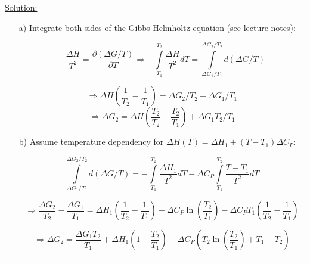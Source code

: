\noindent
\underline{Solution:}\\

\begin{itemize}
\item[a)] Integrate both sides of the Gibbs-Helmholtz equation (see lecture notes):

$$-\frac{\Delta H}{T^2} = \frac{\partial (\Delta G / T)}{\partial T} \Rightarrow -\int\limits_{T_1}^{T_2}\frac{\Delta H}{T^2}dT = \int\limits_{\Delta G_1 / T_1}^{\Delta G_2 / T_2}d\left(\Delta G / T\right)$$

$$\Rightarrow \Delta H\left(\frac{1}{T_2} - \frac{1}{T_1}\right) = \Delta G_2 / T_2 - \Delta G_1 / T_1$$
$$\Rightarrow \Delta G_2 = \Delta H\left(\frac{T_2}{T_2} - \frac{T_2}{T_1}\right) + \Delta G_1T_2 / T_1$$

\item[b)] Assume temperature dependency for $\Delta H(T) = \Delta H_1 + \left(T - T_1\right)\Delta C_P$:

$$\int\limits_{\Delta G_1 / T_1}^{\Delta G_2 / T_2}d\left(\Delta G / T\right) = -\int\limits_{T_1}^{T_2}\frac{\Delta H_1}{T^2}dT - \Delta C_P\int\limits_{T_1}^{T_2}\frac{T - T_1}{T^2}dT$$

$$\Rightarrow \frac{\Delta G_2}{T_2} - \frac{\Delta G_1}{T_1} = \Delta H_1\left(\frac{1}{T_2} - \frac{1}{T_1}\right) - \Delta C_P\ln\left(\frac{T_2}{T_1}\right) - \Delta C_PT_1\left(\frac{1}{T_2} - \frac{1}{T_1}\right)$$

$$\Rightarrow \Delta G_2 = \frac{\Delta G_1 T_2}{T_1} + \Delta H_1\left(1 - \frac{T_2}{T_1}\right) - \Delta C_P\left(T_2\ln\left(\frac{T_2}{T_1}\right) + T_1 - T_2\right)$$

\end{itemize}

\hrule\vspace{0.5cm}
